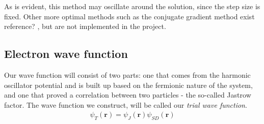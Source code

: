 \documentclass[11pt]{article}
\newcommand{\husk}[1]{\color{red} #1 \color{black}}
\begin{document}
As is evident, this method may oscillate around the solution, since the step size is fixed. Other more optimal methods such as the conjugate gradient method exist\husk{reference?}, but are not implemented in the project.


\subsection{Electron wave function}
Our wave function will consist of two parts: one that comes from the harmonic oscillator potential and is built up based on the fermionic nature of the system, and one that proved a correlation between two particles - the so-called Jastrow factor. The wave function we construct, will be called our \textit{trial wave function}.
\begin{align}
	\psi_T(\mathbf{r}) = \psi_J(\mathbf{r})\psi_{SD}(\mathbf{r})
	\label{eq:WF_trial}
\end{align}
\end{document}

